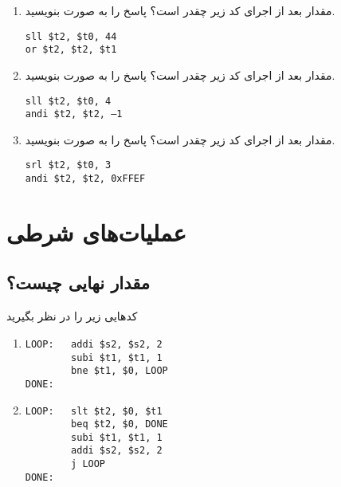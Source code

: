 \documentclass[11pt, dvipsnames, svgnames, x11names]{article}
\begin{document}
\begin{enumerate}
\item 
مقدار  بعد از اجرای کد زیر چقدر است؟ پاسخ را به صورت  بنویسید.

\begin{latin}
\begin{lstlisting}
sll $t2, $t0, 44
or $t2, $t2, $t1
\end{lstlisting}
\end{latin}
\item 
مقدار  بعد از اجرای کد زیر چقدر است؟ پاسخ را به صورت  بنویسید.

\begin{latin}
\begin{lstlisting}[keywords={sll, andi}]
sll $t2, $t0, 4
andi $t2, $t2, –1
\end{lstlisting}
\end{latin}

\item 
مقدار  بعد از اجرای کد زیر چقدر است؟ پاسخ را به صورت  بنویسید.

\begin{latin}
\begin{lstlisting}[keywords={srl, andi}]
srl $t2, $t0, 3
andi $t2, $t2, 0xFFEF
\end{lstlisting}
\end{latin}
\end{enumerate}

\section{عملیات‌های شرطی }
\subsection{مقدار نهایی چیست؟}
کد‌هایی زیر را در نظر بگیرید
\begin{latin}
\begin{enumerate}
\item
\begin{lstlisting}[keywords={addi, subi, bne}]
LOOP:   addi $s2, $s2, 2
        subi $t1, $t1, 1
        bne $t1, $0, LOOP
DONE:
\end{lstlisting}

\item
\begin{lstlisting}[keywords={slt, beq, subi, addi, j}]
LOOP:   slt $t2, $0, $t1
        beq $t2, $0, DONE
        subi $t1, $t1, 1
        addi $s2, $s2, 2
        j LOOP
DONE:
\end{lstlisting}
\end{enumerate}
\end{latin}
\end{document}

